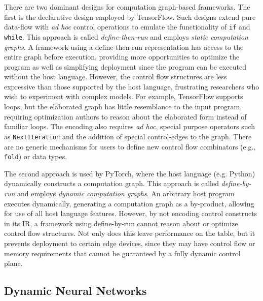 There are two dominant designs for computation graph-based frameworks.
The first is the declarative design employed by TensorFlow.
Such designs extend pure data-flow with \textit{ad hoc} control operations
  to emulate the functionality of \verb|if| and \verb|while|.
This approach is called \textit{define-then-run} and employs \textit{static
computation graphs}.
A framework using a define-then-run representation has access to the entire
  graph before execution, providing more opportunities to optimize the program
  as well as simplifying deployment since the program can be executed
  without the host language.
However, the control flow structures are less expressive than those supported
  by the host language, frustrating researchers who wish to experiment with complex models.
For example, TensorFlow supports loops,
  but the elaborated graph has little resemblance to the input program, requiring optimization
  authors to reason about the elaborated form instead of familiar loops.
The encoding also requires \textit{ad hoc}, special purpose operators such
  as \verb|NextIteration| and the addition of special control-edges to the graph.
There are no generic mechanisms for users to define new control flow
  combinators (e.g., \verb|fold|) or data types.

The second approach is used by PyTorch, where the host language (e.g. Python) dynamically
  constructs a computation graph.
This approach is called \textit{define-by-run} and employs \textit{dynamic computation graphs}.
An arbitrary host program executes dynamically, generating a computation graph as a by-product,
  allowing for use of all host language features.
However, by not encoding control constructs in its IR, a framework
  using define-by-run cannot reason about or optimize control flow structures.
Not only does this leave performance on the table, but it prevents deployment to certain
  edge devices, since they may have control flow or memory requirements that cannot be
  guaranteed by a fully dynamic control plane.

\subsection{Dynamic Neural Networks}

